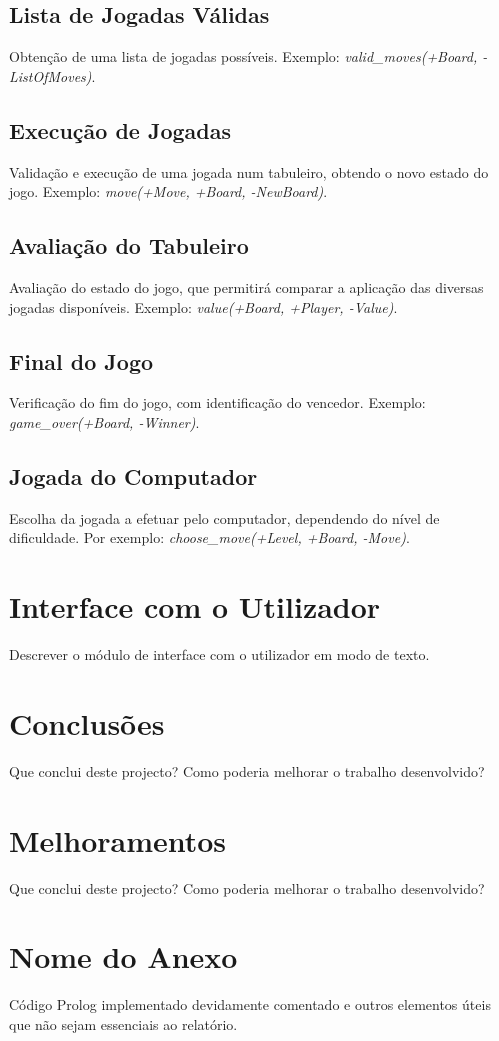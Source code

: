 \documentclass[a4paper]{article}
\begin{document}
\subsection{Lista de Jogadas Válidas} Obtenção de uma lista de jogadas possíveis. Exemplo: \textit{valid\_moves(+Board, -ListOfMoves)}.

\subsection{Execução de Jogadas} Validação e execução de uma jogada num tabuleiro, obtendo o novo estado do jogo. Exemplo: \textit{move(+Move, +Board, -NewBoard)}.

\subsection{Avaliação do Tabuleiro} Avaliação do estado do jogo, que permitirá comparar a aplicação das diversas jogadas disponíveis. Exemplo: \textit{value(+Board, +Player, -Value)}.

\subsection{Final do Jogo} Verificação do fim do jogo, com identificação do vencedor. Exemplo: \textit{game\_over(+Board, -Winner)}.

\subsection{Jogada do Computador} Escolha da jogada a efetuar pelo computador, dependendo do nível de dificuldade. Por exemplo: \textit{choose\_move(+Level, +Board, -Move)}.


\section{Interface com o Utilizador}

Descrever o módulo de interface com o utilizador em modo de texto.


\section{Conclusões}
Que conclui deste projecto? Como poderia melhorar o trabalho desenvolvido?


\section{Melhoramentos}
Que conclui deste projecto? Como poderia melhorar o trabalho desenvolvido?

\clearpage
{}
\renewcommand\refname{Bibliografia}



\newpage
\appendix
\section{Nome do Anexo}
Código Prolog implementado devidamente comentado e outros elementos úteis que não sejam essenciais ao relatório.
\end{document}
